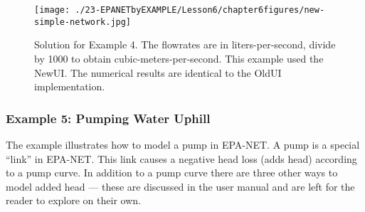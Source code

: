 \begin{figure}[h!] %
   \centering
   \texttt{[image: ./23-EPANETbyEXAMPLE/Lesson6/chapter6figures/new-simple-network.jpg]} 
   \caption{Solution for Example 4.  The flowrates are in liters-per-second, divide by 1000 to obtain cubic-meters-per-second.  This example used the NewUI.  The numerical results are identical to the OldUI implementation.}
   \label{fig:new-simple-network}
\end{figure}
\clearpage

\subsubsection{Example 5: Pumping Water Uphill}
The example illustrates how to model a pump in EPA-NET.  A pump is a special ``link'' in EPA-NET.  This link causes a negative head loss (adds head) according to a pump curve.  In addition to a pump curve there are three other ways to model added head --- these are discussed in the user manual and are left for the reader to explore on their own.

